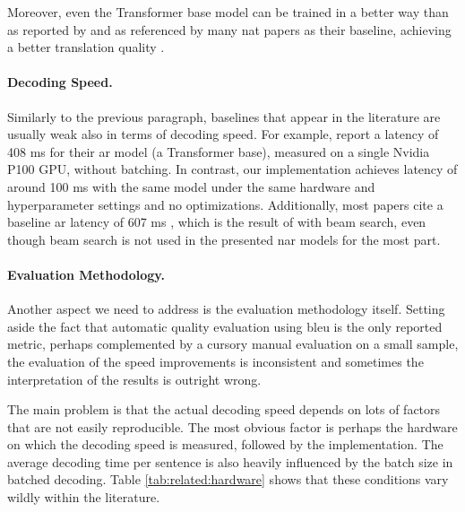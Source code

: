Moreover, even the Transformer base model can be trained in a better way than
as reported by \citet{vaswani2017attention} and as referenced by many \ac{nat}
papers as their baseline, achieving a better translation quality
\citep{popel-bojar-2018-training}.

\paragraph{Decoding Speed.} Similarly to the previous paragraph, baselines that
appear in the literature are usually weak also in terms of decoding speed.  For
example, \citet{gu2017nonautoregressive} report a latency of 408 ms for their
\ac{ar} model (a Transformer base), measured on a single Nvidia P100 GPU,
without batching. In contrast, our implementation achieves latency of around
100 ms with the same model under the same hardware and hyperparameter settings
and no optimizations. Additionally, most papers cite a baseline \ac{ar} latency
of 607 ms , which is the result of
\citet{gu2017nonautoregressive} with beam search, even though beam search is
not used in the presented \ac{nar} models for the most part.




\paragraph{Evaluation Methodology.} Another aspect we need to address is the
evaluation methodology itself. Setting aside the fact that automatic quality
evaluation using \acs{bleu} is the only reported metric, perhaps complemented
by a cursory manual evaluation on a small sample, the evaluation of the speed
improvements is inconsistent and sometimes the interpretation of the results is
outright wrong.

The main problem is that the actual decoding speed depends on lots of factors
that are not easily reproducible. The most obvious factor is perhaps the
hardware on which the decoding speed is measured, followed by the
implementation. The average decoding time per sentence is also heavily
influenced by the batch size in batched decoding. Table
\ref{tab:related:hardware} shows that these conditions vary wildly within the
literature.

